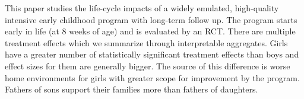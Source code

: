 \noindent This paper studies the life-cycle impacts of a widely emulated, high-quality intensive early childhood program with long-term follow up. The program starts early in life (at 8 weeks of age) and is evaluated by an RCT. There are multiple treatment effects which we summarize through interpretable aggregates. Girls have a greater number of statistically significant treatment effects than boys and effect sizes for them are generally bigger. The source of this difference is worse home environments for girls with greater scope for improvement by the program. Fathers of sons support their families more than fathers of daughters.

